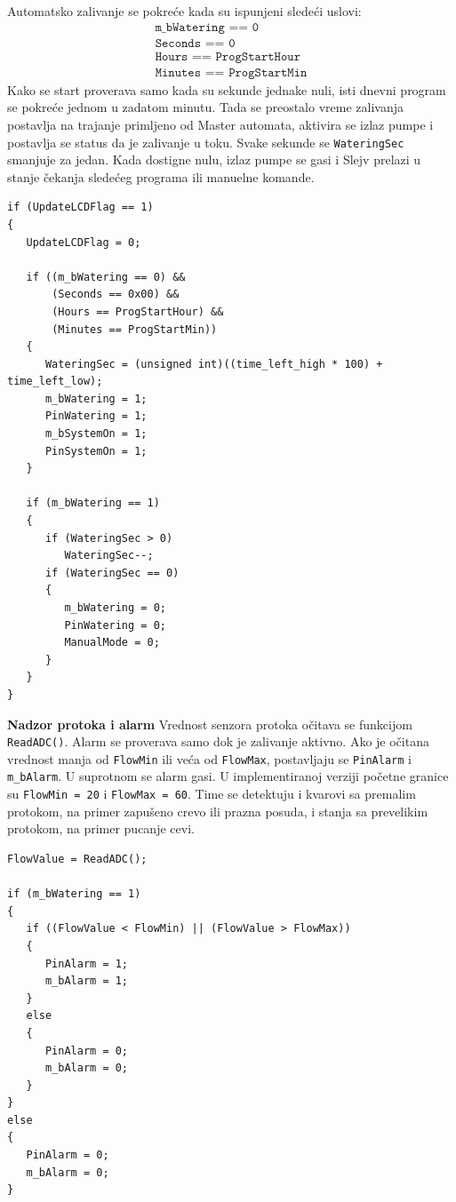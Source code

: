 \documentclass[12pt]{article}
\numberwithin{figure}{section}
\begin{document}
  Automatsko zalivanje se pokreće kada su ispunjeni sledeći uslovi:
  \[
  \begin{gathered}
    \texttt{m\_bWatering == 0}\\
    \texttt{Seconds == 0}\\
    \texttt{Hours == ProgStartHour}\\
    \texttt{Minutes == ProgStartMin}
  \end{gathered}
  \]
  Kako se start proverava samo kada su sekunde jednake nuli, isti dnevni program se pokreće jednom u zadatom minutu.
  Tada se preostalo vreme zalivanja postavlja na trajanje primljeno od Master automata, aktivira se izlaz pumpe i postavlja se status da je zalivanje u toku. 
  Svake sekunde se \texttt{WateringSec} smanjuje za jedan. 
  Kada dostigne nulu, izlaz pumpe se gasi i Slejv prelazi u stanje čekanja sledećeg programa ili manuelne komande.
  \begin{verbatim}
if (UpdateLCDFlag == 1)
{
   UpdateLCDFlag = 0;

   if ((m_bWatering == 0) &&
       (Seconds == 0x00) &&
       (Hours == ProgStartHour) &&
       (Minutes == ProgStartMin))
   {
      WateringSec = (unsigned int)((time_left_high * 100) + time_left_low);
      m_bWatering = 1;
      PinWatering = 1;
      m_bSystemOn = 1;
      PinSystemOn = 1;
   }

   if (m_bWatering == 1)
   {
      if (WateringSec > 0)
         WateringSec--;
      if (WateringSec == 0)
      {
         m_bWatering = 0;
         PinWatering = 0;
         ManualMode = 0;
      }
   }
}
  \end{verbatim}

  \textbf{Nadzor protoka i alarm}
  Vrednost senzora protoka očitava se funkcijom \texttt{ReadADC()}. 
  Alarm se proverava samo dok je zalivanje aktivno. 
  Ako je očitana vrednost manja od \texttt{FlowMin} ili veća od \texttt{FlowMax}, postavljaju se \texttt{PinAlarm} i \texttt{m\_bAlarm}. 
  U suprotnom se alarm gasi. 
  U implementiranoj verziji početne granice su \texttt{FlowMin = 20} i \texttt{FlowMax = 60}. 
  Time se detektuju i kvarovi sa premalim protokom, na primer zapušeno crevo ili prazna posuda, i stanja sa prevelikim protokom, na primer pucanje cevi.
  \begin{verbatim}
FlowValue = ReadADC();

if (m_bWatering == 1)
{
   if ((FlowValue < FlowMin) || (FlowValue > FlowMax))
   {
      PinAlarm = 1;
      m_bAlarm = 1;
   }
   else
   {
      PinAlarm = 0;
      m_bAlarm = 0;
   }
}
else
{
   PinAlarm = 0;
   m_bAlarm = 0;
}
  \end{verbatim}
\end{document}
